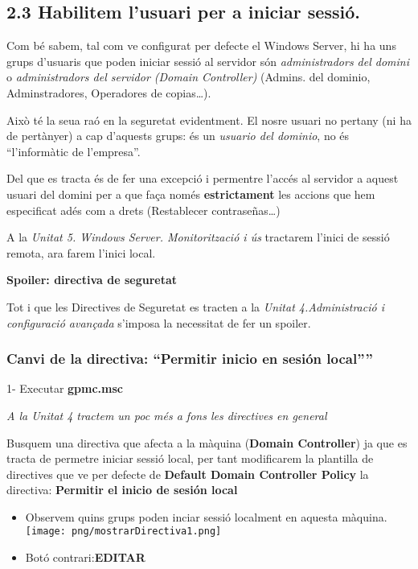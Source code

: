 \documentclass[
  a4paper,
]{article}
\begin{document}
\subsection{2.3 Habilitem l'usuari per a iniciar
sessió.}\label{habilitem-lusuari-per-a-iniciar-sessiuxf3.}

Com bé sabem, tal com ve configurat per defecte el Windows Server, hi ha
uns grups d'usuaris que poden iniciar sessió al servidor són
\emph{administradors del domini} o \emph{administradors del servidor
(Domain Controller)} (Admins. del dominio, Adminstradores, Operadores de
copias\ldots).

Això té la seua raó en la seguretat evidentment. El nosre usuari no
pertany (ni ha de pertànyer) a cap d'aquests grups: és un \emph{usuario
del dominio}, no és ``l'informàtic de l'empresa''.

Del que es tracta és de fer una excepció i permentre l'accés al servidor
a aquest usuari del domini per a que faça només \textbf{estrictament}
les accions que hem especificat adés com a drets (Restablecer
contraseñas\ldots)

A la \emph{Unitat 5. Windows Server. Monitorització i ús} tractarem
l'inici de sessió remota, ara farem l'inici local.

\textbf{Spoiler: directiva de seguretat}

Tot i que les Directives de Seguretat es tracten a la \emph{Unitat
4.Administració i configuració avançada} s'imposa la necessitat de fer
un spoiler.

\subsubsection{\texorpdfstring{Canvi de la directiva: ``Permitir inicio
en sesión
local''''}{Canvi de la directiva: ``Permitir inicio en sesión local''\,''}}\label{canvi-de-la-directiva-permitir-inicio-en-sesiuxf3n-local}

1- Executar \textbf{gpmc.msc}

\emph{A la Unitat 4 tractem un poc més a fons les directives en general}

Busquem una directiva que afecta a la màquina (\textbf{Domain
Controller}) ja que es tracta de permetre iniciar sessió local, per tant
modificarem la plantilla de directives que ve per defecte de
\textbf{Default Domain Controller Policy} la directiva: \textbf{Permitir
el inicio de sesión local}

\begin{itemize}
\item
  Observem quins grups poden inciar sessió localment en aquesta màquina.
  \texttt{[image: png/mostrarDirectiva1.png]}
\item
  Botó contrari:\textbf{EDITAR}
\end{itemize}
\end{document}
